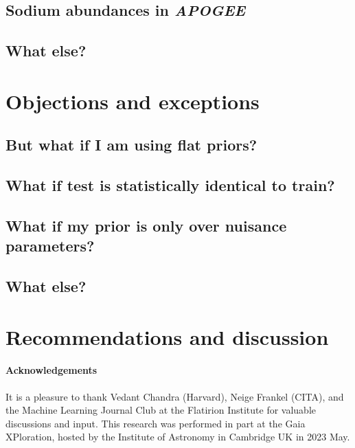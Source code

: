 \documentclass[10pt]{article}
\begin{document}
\subsection{Sodium abundances in \textsl{APOGEE}}

\subsection{What else?}

\section{Objections and exceptions}

\subsection{But what if I am using flat priors?}

\subsection{What if test is statistically identical to train?}

\subsection{What if my prior is only over nuisance parameters?}

\subsection{What else?}

\section{Recommendations and discussion}

\paragraph{Acknowledgements}
It is a pleasure to thank
  Vedant Chandra (Harvard),
  Neige Frankel (CITA),
and the Machine Learning Journal Club at the Flatirion Institute
for valuable discussions and input.
This research was performed in part at the Gaia XPloration, hosted by the Institute of Astronomy in Cambridge UK in 2023 May.


\raggedright

\end{document}

